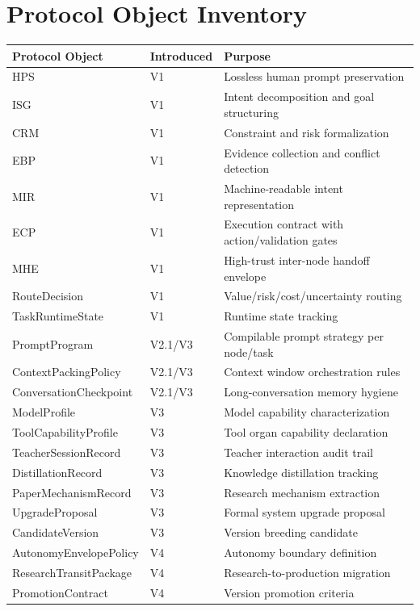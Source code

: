 \documentclass[12pt,a4paper]{article}
\begin{document}
\section{Protocol Object Inventory}


\begin{table}[htbp]
\centering
\small
\begin{tabular}{lll}
\toprule
Protocol Object & Introduced & Purpose \\
\midrule
HPS & V1 & Lossless human prompt preservation \\
ISG & V1 & Intent decomposition and goal structuring \\
CRM & V1 & Constraint and risk formalization \\
EBP & V1 & Evidence collection and conflict detection \\
MIR & V1 & Machine-readable intent representation \\
ECP & V1 & Execution contract with action/validation gates \\
MHE & V1 & High-trust inter-node handoff envelope \\
RouteDecision & V1 & Value/risk/cost/uncertainty routing \\
TaskRuntimeState & V1 & Runtime state tracking \\
PromptProgram & V2.1/V3 & Compilable prompt strategy per node/task \\
ContextPackingPolicy & V2.1/V3 & Context window orchestration rules \\
ConversationCheckpoint & V2.1/V3 & Long-conversation memory hygiene \\
ModelProfile & V3 & Model capability characterization \\
ToolCapabilityProfile & V3 & Tool organ capability declaration \\
TeacherSessionRecord & V3 & Teacher interaction audit trail \\
DistillationRecord & V3 & Knowledge distillation tracking \\
PaperMechanismRecord & V3 & Research mechanism extraction \\
UpgradeProposal & V3 & Formal system upgrade proposal \\
CandidateVersion & V3 & Version breeding candidate \\
AutonomyEnvelopePolicy & V4 & Autonomy boundary definition \\
ResearchTransitPackage & V4 & Research-to-production migration \\
PromotionContract & V4 & Version promotion criteria \\

\end{tabular}
\end{table}
\end{document}
